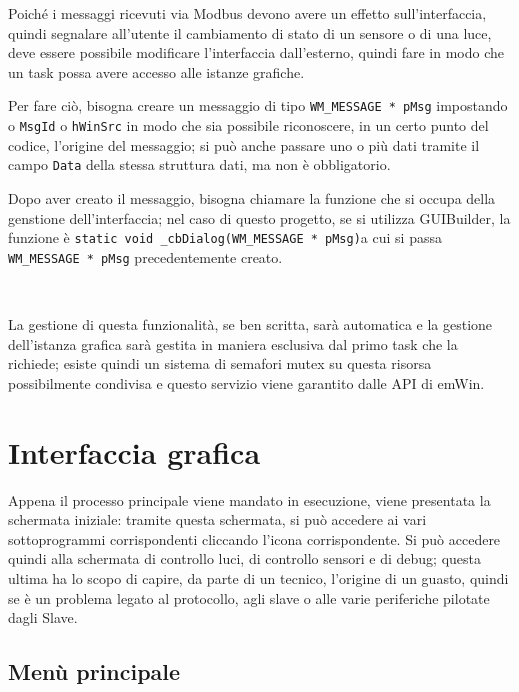 \documentclass[a4paper,titlepage]{book}
\newcommand{\code}{\lstinline}
\begin{document}
Poiché i messaggi ricevuti via Modbus devono avere un effetto sull'interfaccia, quindi segnalare all'utente il cambiamento di stato di un sensore o di una luce, deve essere possibile modificare l'interfaccia dall'esterno, quindi fare in modo che un task possa avere accesso alle istanze grafiche.

Per fare ciò, bisogna creare un messaggio di tipo \code!WM_MESSAGE * pMsg! impostando o \code!MsgId! o \code!hWinSrc! in modo che sia possibile riconoscere, in un certo punto del codice, l'origine del messaggio; si può anche passare uno o più dati tramite il campo \code!Data! della stessa struttura dati, ma non è obbligatorio.

Dopo aver creato il messaggio, bisogna chiamare la funzione che si occupa della genstione dell'interfaccia; nel caso di questo progetto, se si utilizza GUIBuilder, la funzione è \newline \code!static void _cbDialog(WM_MESSAGE * pMsg)!\newline a cui si passa \code!WM_MESSAGE * pMsg! precedentemente creato.

~

La gestione di questa funzionalità, se ben scritta, sarà automatica e la gestione dell'istanza grafica sarà gestita in maniera esclusiva dal primo task che la richiede; esiste quindi un sistema di semafori mutex su questa risorsa possibilmente condivisa e questo servizio viene garantito dalle API di emWin.

\section{Interfaccia grafica}

Appena il processo principale viene mandato in esecuzione, viene presentata la schermata iniziale: tramite questa schermata, si può accedere ai vari sottoprogrammi corrispondenti cliccando l'icona corrispondente. Si può accedere quindi alla schermata di controllo luci, di controllo sensori e di debug; questa ultima ha lo scopo di capire, da parte di un tecnico, l'origine di un guasto, quindi se è un problema legato al protocollo, agli slave o alle varie periferiche pilotate dagli Slave. 

\newpage

\subsection{Menù principale}
\end{document}

